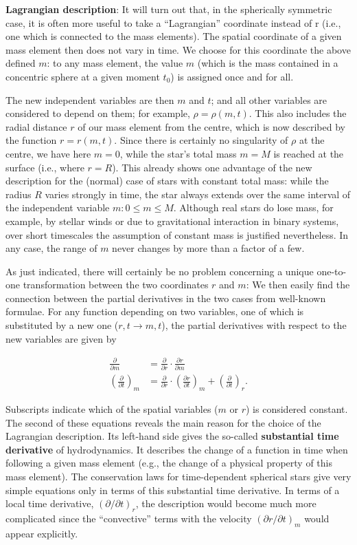 \documentclass[a4paper,10pt]{article}
\begin{document}
{\noindent}\textbf{Lagrangian description}: It will turn out that, in the spherically symmetric case, it is often more useful to take a ``Lagrangian'' coordinate instead of r (i.e., one which is connected to the mass elements). The spatial coordinate of a given mass element then does not vary in time. We choose for this coordinate the above defined $m$: to any mass element, the value $m$ (which is the mass contained in a concentric sphere at a given moment $t_0$) is assigned once and for all.

{\noindent}The new independent variables are then $m$ and $t$; and all other variables are considered to depend on them; for example, $\rho=\rho(m,t)$. This also includes the radial distance $r$ of our mass element from the centre, which is now described by the function $r=r(m,t)$. Since there is certainly no singularity of $\rho$ at the centre, we have here $m=0$, while the star's total mass $m=M$ is reached at the surface (i.e., where $r=R$). This already shows one advantage of the new description for the (normal) case of stars with constant total mass: while the radius $R$ varies strongly in time, the star always extends over the same interval of the independent variable $m:0\leq m \leq M$. Although real stars do lose mass, for example, by stellar winds or due to gravitational interaction in binary systems, over short timescales the assumption of constant mass is justified nevertheless. In any case, the range of $m$ never changes by more than a factor of a few.

{\noindent}As just indicated, there will certainly be no problem concerning a unique one-to-one transformation between the two coordinates $r$ and $m$: We then easily find the connection between the partial derivatives in the two cases from well-known formulae. For any function depending on two variables, one of which is substituted by a new one ($r,t\rightarrow m,t$), the partial derivatives with respect to the new variables are given by

\begin{align*}
    \frac{\partial}{\partial m} &= \frac{\partial}{\partial r} \cdot \frac{\partial r}{\partial m} \\
    \left(\frac{\partial}{\partial t}\right)_m &= \frac{\partial}{\partial r}\cdot \left(\frac{\partial r}{\partial t}\right)_m + \left(\frac{\partial}{\partial t}\right)_r.
\end{align*}

{\noindent}Subscripts indicate which of the spatial variables ($m$ or $r$) is considered constant. The second of these equations reveals the main reason for the choice of the Lagrangian description. Its left-hand side gives the so-called \textbf{substantial time derivative} of hydrodynamics. It describes the change of a function in time when following a given mass element (e.g., the change of a physical property of this mass element). The conservation laws for time-dependent spherical stars give very simple equations only in terms of this substantial time derivative. In terms of a local time derivative, $(\partial/\partial t)_r$, the description would become much more complicated since the ``convective'' terms with the velocity $(\partial r/\partial t)_m$ would appear explicitly.
\end{document}
